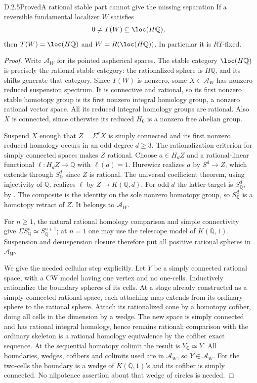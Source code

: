 \begin{claim}{D.2.5}{Proved}{A rational stable part cannot give the missing separation}
If a reversible fundamental localizer $W$ satisfies
\[
 0\ne T(W)\subseteq\loc(H\mathbb Q),
\]
then $T(W)=\loc(H\mathbb Q)$ and
$W=R(\loc(H\mathbb Q))$. In particular it is $RT$-fixed.
\end{claim}
\begin{proof}
Write $\mathcal A_W$ for its pointed aspherical spaces. The stable
category $\loc(H\mathbb Q)$ is precisely the rational stable category:
the rationalized sphere is $H\mathbb Q$, and its shifts generate that
category. Since $T(W)$ is nonzero, some $X\in\mathcal A_W$ has nonzero
reduced suspension spectrum. It is connective and rational, so its
first nonzero stable homotopy group is its first nonzero integral
homology group, a nonzero rational vector space. All its reduced
integral homology groups are rational. Also $X$ is connected, since
otherwise its reduced $H_0$ is a nonzero free abelian group.

Suspend $X$ enough that $Z=\Sigma^rX$ is simply connected and its first
nonzero reduced homology occurs in an odd degree $d\geq3$.
The rationalization criterion for simply connected spaces
\cite[Theorems~6.1.1--6.1.2]{FGHMayPonto2012} makes $Z$ rational.
Choose $a\in H_dZ$ and a rational-linear functional
$\ell:H_dZ\to\mathbb Q$ with $\ell(a)=1$.
Hurewicz realizes $a$ by $S^d\to Z$, which extends through
$S^d_{\mathbb Q}$ since $Z$ is rational. The universal coefficient
theorem, using injectivity of $\mathbb Q$, realizes $\ell$ by
$Z\to K(\mathbb Q,d)$. For odd $d$ the latter target is
$S^d_{\mathbb Q}$, by \cite[Corollary~6.7.3]{FGHMayPonto2012}.
The composite is the identity on the sole nonzero homotopy group, so
$S^d_{\mathbb Q}$ is a homotopy retract of $Z$. It belongs to
$\mathcal A_W$.

For $n\geq1$, the natural rational homology comparison and simple
connectivity give
$\Sigma S^n_{\mathbb Q}\simeq S^{n+1}_{\mathbb Q}$; at $n=1$ one
may use the telescope model of $K(\mathbb Q,1)$.
Suspension and desuspension closure therefore put all positive
rational spheres in $\mathcal A_W$.

We give the needed cellular step explicitly. Let $Y$ be a simply
connected rational space, with a CW model having one vertex and no
one-cells. Inductively rationalize the boundary spheres of its cells.
At a stage already constructed as a simply connected rational space,
each attaching map extends from its ordinary sphere to the rational
sphere. Attach its rationalized cone by a homotopy cofiber, doing all
cells in the dimension by a wedge. The new space is simply connected
and has rational integral homology, hence remains rational; comparison
with the ordinary skeleton is a rational homology equivalence by the
cofiber exact sequence. At the sequential homotopy colimit the result
is $Y_{\mathbb Q}\simeq Y$. All boundaries, wedges, cofibers and
colimits used are in $\mathcal A_W$, so $Y\in\mathcal A_W$.
For the two-cells the boundary is a wedge of $K(\mathbb Q,1)$'s and
its cofiber is simply connected. No nilpotence assertion about that
wedge of circles is needed.


\end{proof}
